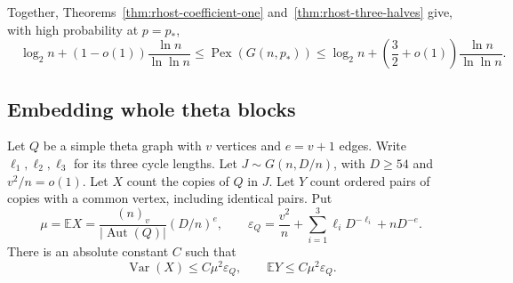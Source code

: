 Together, Theorems~\ref{thm:rhost-coefficient-one} and~\ref{thm:rhost-three-halves}
give, with high probability at $p=p_*$,
\[
 \boxed{\quad
 \log_2n+(1-o(1))\frac{\ln n}{\ln\ln n}
 \le\operatorname{Pex}(G(n,p_*))
 \le\log_2n+\left(\frac32+o(1)\right)\frac{\ln n}{\ln\ln n}.
 \quad}
\]

\subsection{Embedding whole theta blocks}
\label{subsec:rhost-whole-theta}

\begin{lemma}
\label{lem:rhost-theta-moments}
Let $Q$ be a simple theta graph with $v$ vertices and $e=v+1$ edges.
Write $\ell_1,\ell_2,\ell_3$ for its three cycle lengths.
Let $J\sim G(n,D/n)$, with $D\ge54$ and $v^2/n=o(1)$.
Let $X$ count the copies of $Q$ in $J$.
Let $Y$ count ordered pairs of copies with a common vertex, including identical pairs.
Put
\[
 \mu=\mathbb E X=\frac{(n)_v}{|\operatorname{Aut}(Q)|}(D/n)^e,
 \qquad
 \varepsilon_Q=\frac{v^2}{n}
 +\sum_{i=1}^{3}\ell_iD^{-\ell_i}+nD^{-e}.
\]
There is an absolute constant $C$ such that
\[
 \operatorname{Var}(X)\le C\mu^2\varepsilon_Q,
 \qquad \mathbb E Y\le C\mu^2\varepsilon_Q.
\]
\end{lemma}

